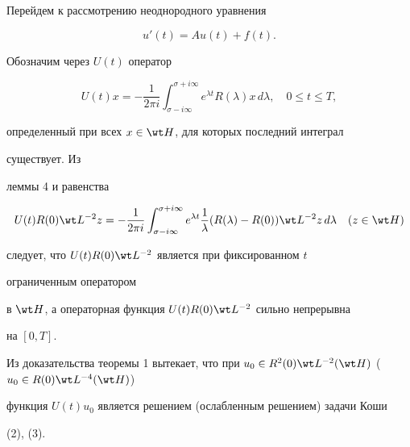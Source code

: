  


 


Перейдем к рассмотрению неоднородного уравнения 


\begin{equation} 


u'(t)=Au(t)+f(t). 


\end{equation} 


Обозначим через $U(t)$ оператор 


$$ 


U(t)x= 


-\frac{1}{2\pi i}\int^{\sigma+i\infty}_{\sigma-i\infty}e^{\lambda t} 


R(\lambda)x\,d\lambda,\quad 0\le t\le T, 


$$ 


определенный при всех $x\in\wt H$, для которых последний интеграл 


существует. Из 


леммы 4 и равенства 


$$ 


U(t)R(0)\wt L{}^{-2}z= 


-\frac{1}{2\pi i}\int^{\sigma+i\infty}_{\sigma-i\infty}e^{\lambda t} 


\frac{1}{\lambda}(R(\lambda)-R(0))\wt L{}^{-2}z\,d\lambda 


\quad (z\in\wt H) 


$$ 


следует, что $U(t)R(0)\wt L{}^{-2}$ является при фиксированном $t$ 


ограниченным оператором 


в $\wt H$, а операторная функция $U(t)R(0)\wt L{}^{-2}$ сильно непрерывна 


на $[0,T]$. 


Из доказательства теоремы 1 вытекает, что при $u_0\in R^2(0)\wt 


L{}^{-2}(\wt H)$ ($u_0\in R(0)\wt L{}^{-4}(\wt H)$) 


функция $U(t)u_0$ является решением (ослабленным решением) задачи Коши 


(2), (3). 


 


 


